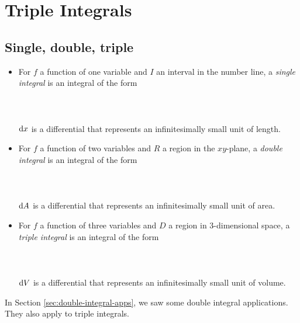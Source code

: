 \newlecture
\setcounter{chapter}{11}
\setcounter{section}{6}

\def\coursetopicnumber{III}
\def\topic{Triple Integrals} %
\def\shorttopic{Triple integrals} %
\def\textbookname{Active Calculus} %
\def\shorttextbookname{AC} %
\def\textbooksection{11.7} %
\def\textbooksectionurl{https://activecalculus.org/vector/S-11-7-Triple-Integrals.html} %
\def\handoutday{} %


\thispagestyle{plain}
\topstuff
\section{\topic{} \booklink{}}
\label{sec:triple-integrals}
\subsection{Single, double, triple}
\begin{itemize}
    \item For $f$ a function of one variable and $I$ an interval in the number line, a \emph{single integral} is an integral of the form 
    \[
        \phantom{\int\limits_I f\dx.}
    \]
    $\mathop{}\!\mathrm{d} x$ is a differential that represents an infinitesimally small unit of length.

    \item For $f$ a function of two variables and $R$ a region in the $xy$-plane, a \emph{double integral} is an integral of the form 
    \[
        \phantom{\iint\limits_R f\dA.}
    \]
    $\mathop{}\!\mathrm{d} A$ is a differential that represents an infinitesimally small unit of area.
    
    \item For $f$ a function of three variables and $D$ a region in 3-dimensional space, a \emph{triple integral} is an integral of the form 
    \[
        \phantom{\iiint\limits_D f\dV.}
    \]
    $\mathop{}\!\mathrm{d} V$ is a differential that represents an infinitesimally small unit of volume.
\end{itemize}

In Section \ref{sec:double-integral-apps}, we saw some double integral applications. They also apply to triple integrals.

